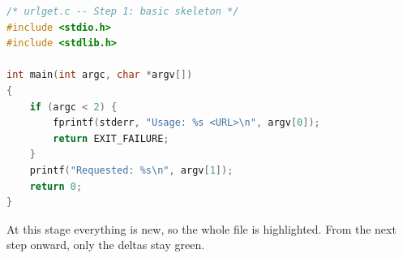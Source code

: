 \begin{lstlisting}[style=newcode,language=C,firstnumber=1]
/* urlget.c -- Step 1: basic skeleton */
#include <stdio.h>
#include <stdlib.h>

int main(int argc, char *argv[])
{
    if (argc < 2) {
        fprintf(stderr, "Usage: %s <URL>\n", argv[0]);
        return EXIT_FAILURE;
    }
    printf("Requested: %s\n", argv[1]);
    return 0;
}
\end{lstlisting}
\FullSourceStop

At this stage everything is new, so the whole file is highlighted. From the
next step onward, only the deltas stay green.
